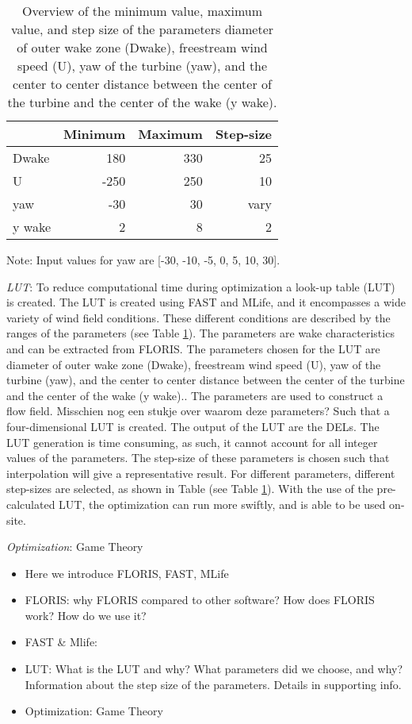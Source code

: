 \documentclass[twoside,twocolumn]{article}
\begin{document}
\begin{table}[h]
	\caption{Overview of the minimum value, maximum value, and step size of the parameters diameter of outer wake zone (Dwake), freestream wind speed (U), yaw of the turbine (yaw), and the center to center distance between the center of the turbine and the center of the wake (y wake).}
	\centering
	\label{tab:pars}
	\begin{tabular}{lrrr}
	\hline
	 & Minimum & Maximum & Step-size \\ 
	\hline
	Dwake & 180 & 330 & 25 \\
	U & -250 & 250 & 10 \\
	yaw & -30 & 30 & vary \\
	y wake & 2 & 8 & 2 \\
	\hline
	\end{tabular}

Note: Input values for yaw are [-30, -10, -5, 0, 5, 10, 30].
\end{table}

\textit{LUT}: To reduce computational time during optimization a look-up table (LUT) is created. The LUT is created using FAST and MLife, and it encompasses a wide variety of wind field conditions. 
These different conditions are described by the ranges of the parameters (see Table \ref{tab:pars}). The parameters are wake characteristics and can be extracted from FLORIS. The parameters chosen for the LUT are diameter of outer wake zone (Dwake), freestream wind speed (U), yaw of the turbine (yaw), and the center to center distance between the center of the turbine and the center of the wake (y wake).. The parameters are used to construct a flow field. Misschien nog een stukje over waarom deze parameters? Such that a four-dimensional LUT is created. The output of the LUT are the DELs. The LUT generation is time consuming, as such, it cannot account for all integer values of the parameters. The step-size of these parameters is chosen such that interpolation will give a representative result. For different parameters, different step-sizes are selected, as shown in Table (see Table \ref{tab:pars}). With the use of the pre-calculated LUT, the optimization can run more swiftly, and is able to be used on-site.

\textit{Optimization}: Game Theory

	\begin{itemize}
		\item Here we introduce FLORIS, FAST, MLife
		\item FLORIS: why FLORIS compared to other software? How does FLORIS work? How do we use it?
		\item FAST \& Mlife:
		\item LUT: What is the LUT and why? What parameters did we choose, and why? Information about the step size of the parameters. Details in supporting info.
		\item Optimization: Game Theory
	\end{itemize}
	\blindtext %
	
\end{document}
